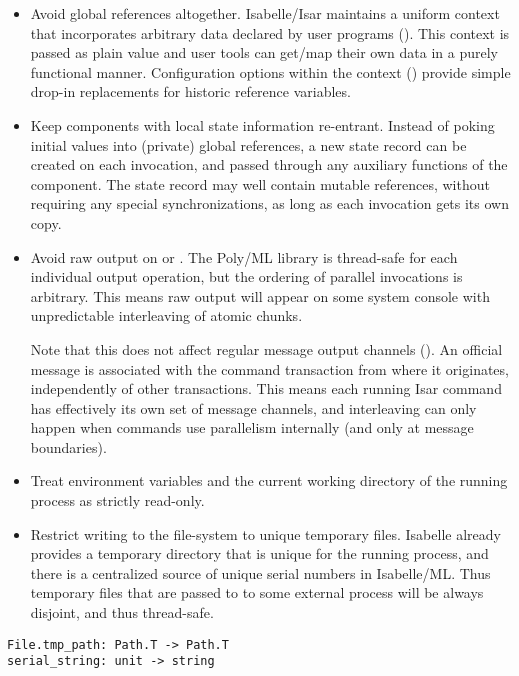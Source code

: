 \begin{isabellebody}
\begin{isamarkuptext}
\begin{itemize}
  \item Avoid global references altogether.  Isabelle/Isar maintains a
  uniform context that incorporates arbitrary data declared by user
  programs ().  This context is passed as
  plain value and user tools can get/map their own data in a purely
  functional manner.  Configuration options within the context
  () provide simple drop-in replacements
  for historic reference variables.

  \item Keep components with local state information re-entrant.
  Instead of poking initial values into (private) global references, a
  new state record can be created on each invocation, and passed
  through any auxiliary functions of the component.  The state record
  may well contain mutable references, without requiring any special
  synchronizations, as long as each invocation gets its own copy.

  \item Avoid raw output on  or .  The
  Poly/ML library is thread-safe for each individual output operation,
  but the ordering of parallel invocations is arbitrary.  This means
  raw output will appear on some system console with unpredictable
  interleaving of atomic chunks.

  Note that this does not affect regular message output channels
  ().  An official message is associated
  with the command transaction from where it originates, independently
  of other transactions.  This means each running Isar command has
  effectively its own set of message channels, and interleaving can
  only happen when commands use parallelism internally (and only at
  message boundaries).

  \item Treat environment variables and the current working directory
  of the running process as strictly read-only.

  \item Restrict writing to the file-system to unique temporary files.
  Isabelle already provides a temporary directory that is unique for
  the running process, and there is a centralized source of unique
  serial numbers in Isabelle/ML.  Thus temporary files that are passed
  to to some external process will be always disjoint, and thus
  thread-safe.

  \end{itemize}%
\end{isamarkuptext}%
\isamarkuptrue%
%
\isadelimmlref
%
\endisadelimmlref
%
\isatagmlref
%
\begin{isamarkuptext}%
\begin{mldecls}
  \verb|File.tmp_path: Path.T -> Path.T| \\
  \verb|serial_string: unit -> string| \\
  \end{mldecls}


\end{isamarkuptext}
\end{isabellebody}
